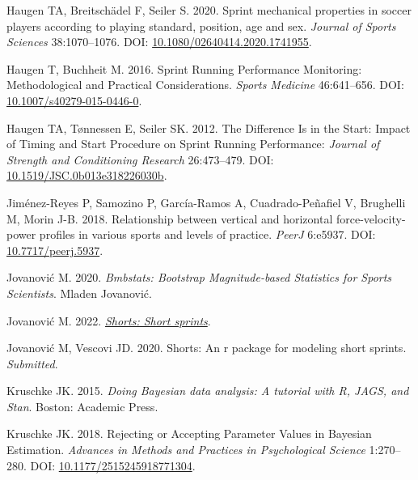 \documentclass[fleqn,10pt]{wlpeerj} %
\newlength{\cslhangindent}
\newlength{\cslentryspacingunit} %
\newenvironment{CSLReferences}[2] %
 {%
  \setlength{\parindent}{0pt}
  \ifodd #1
  \let\oldpar\par
  \def\par{\hangindent=\cslhangindent\oldpar}
  \fi
  \setlength{\parskip}{#2\cslentryspacingunit}
 }%
 {}
\begin{document}
\begin{CSLReferences}{1}{0}
\leavevmode{}%
Haugen TA, Breitschädel F, Seiler S. 2020. Sprint mechanical properties in soccer players according to playing standard, position, age and sex. \emph{Journal of Sports Sciences} 38:1070--1076. DOI: \href{https://doi.org/10.1080/02640414.2020.1741955}{10.1080/02640414.2020.1741955}.

\leavevmode{}%
Haugen T, Buchheit M. 2016. Sprint {Running Performance Monitoring}: {Methodological} and {Practical Considerations}. \emph{Sports Medicine} 46:641--656. DOI: \href{https://doi.org/10.1007/s40279-015-0446-0}{10.1007/s40279-015-0446-0}.

\leavevmode{}%
Haugen TA, Tønnessen E, Seiler SK. 2012. The {Difference Is} in the {Start}: {Impact} of {Timing} and {Start Procedure} on {Sprint Running Performance}: \emph{Journal of Strength and Conditioning Research} 26:473--479. DOI: \href{https://doi.org/10.1519/JSC.0b013e318226030b}{10.1519/JSC.0b013e318226030b}.

\leavevmode{}%
Jiménez-Reyes P, Samozino P, García-Ramos A, Cuadrado-Peñafiel V, Brughelli M, Morin J-B. 2018. Relationship between vertical and horizontal force-velocity-power profiles in various sports and levels of practice. \emph{PeerJ} 6:e5937. DOI: \href{https://doi.org/10.7717/peerj.5937}{10.7717/peerj.5937}.

\leavevmode{}%
Jovanović M. 2020. \emph{Bmbstats: {Bootstrap Magnitude}-based {Statistics} for {Sports Scientists}}. {Mladen Jovanović}.

\leavevmode{}%
Jovanović M. 2022. \emph{\href{ttps://CRAN.R-project.org/package=shorts}{Shorts: Short sprints}}.

\leavevmode{}%
Jovanović M, Vescovi JD. 2020. Shorts: An r package for modeling short sprints. \emph{Submitted}.

\leavevmode{}%
Kruschke JK. 2015. \emph{Doing {Bayesian} data analysis: A tutorial with {R}, {JAGS}, and {Stan}}. {Boston}: {Academic Press}.

\leavevmode{}%
Kruschke JK. 2018. Rejecting or {Accepting Parameter Values} in {Bayesian Estimation}. \emph{Advances in Methods and Practices in Psychological Science} 1:270--280. DOI: \href{https://doi.org/10.1177/2515245918771304}{10.1177/2515245918771304}.


\end{CSLReferences}
\end{document}
